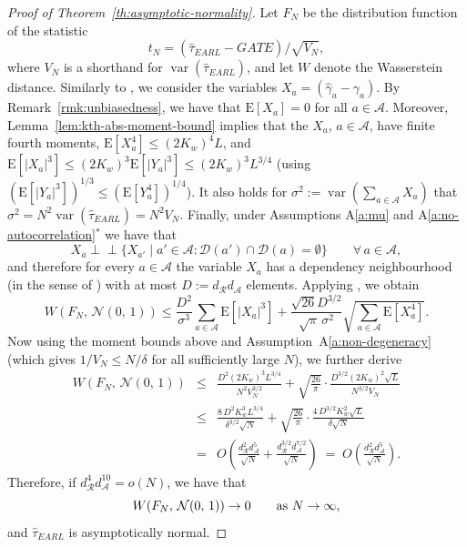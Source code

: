 \documentclass[sigconf,nonacm]{acmart}
\newcommand{\E}{\mathrm E}
\newcommand{\ind}{\perp\!\!\!\perp}
\DeclareMathOperator{\var}{var}
\begin{document}
\begin{proof}[Proof of Theorem~\ref{th:asymptotic-normality}]
    Let $F_N$ be the distribution function of the statistic
    $$
        t_N = {(\hat\tau^{\phantom{1}}_{EARL} - GATE)}/\sqrt{V_N},
    $$
    where $V_N$ is a shorthand for $\var(\hat\tau^{\phantom{1}}_{EARL})$,
    and let $W$ denote the Wasserstein distance.
    Similarly to \cite[Theorem~4.3]{harshaw2023erl}, we consider the variables $X_a = (\hat\gamma_a-\gamma_a)$. By Remark~\ref{rmk:unbiasedness}, we have that $\E[X_a] = 0$ for all $a\in\mathcal{A}$. Moreover, Lemma~\ref{lem:kth-abs-moment-bound} implies that the $X_a$, $a\in\mathcal{A}$, have finite fourth moments, $\E[X_a^4]\le (2K_w)^4L$, and $\E[|X_a|^3]\le (2K_w)^3\E[|Y_a|^3] \le (2K_w)^3L^{3/4}$ (using $(\E[|Y_a|^3])^{1/3}\le (\E[Y_a^4])^{1/4}$). It also holds for $\sigma^2 := \var(\sum_{a\in\mathcal{A}}X_a)$ that $\sigma^2 = N^2\var(\hat\tau^{\phantom{1}}_{EARL})=N^2V_N$. Finally,
    under Assumptions A\ref{a:mu} and A\ref{a:no-autocorrelation}$^*$ we have that
    \begin{equation*}
        X_a \ind \{X_{a'}\mid a'\in\mathcal A\colon \mathcal D(a')\cap \mathcal D(a)=\emptyset\}\qquad\forall\,a\in\mathcal A,
    \end{equation*}
    and therefore for every $a\in\mathcal A$ the variable $X_a$ has a dependency neighbourhood (in the sense of \cite[Definition~3.1]{Ro:11}) with at most $D:=d_{\mathcal R}d_{\mathcal A}$ elements. Applying \cite[Theorem~3.5]{Ro:11}, we obtain
    \begin{equation*}
        W(F_N,\,\mathcal{N}(0,\,1)) \le \frac{D^2}{\sigma^3}\sum_{a\in\mathcal A}\E[|X_a|^3] + \frac{\sqrt{26}D^{3/2}}{\sqrt{\pi}\,\sigma^2}\sqrt{\sum_{a\in\mathcal A}\E[
        X_a^4]}.
    \end{equation*}
    Now using the moment bounds above and Assumption~A\ref{a:non-degeneracy} (which gives $1/V_N \le N/\delta$ for all sufficiently large $N$), we further derive
    \begin{eqnarray*}
        W(F_N,\,\mathcal{N}(0,\,1)) &\le&
        \frac{D^2(2K_w)^3L^{3/4}}{N^2V_N^{3/2}}
        + \sqrt{\frac{26}{\pi}}\cdot\frac{D^{3/2}(2K_w)^2\sqrt{L}}{N^{3/2}V_N}\\
        &\le&\frac{8\,D^2K_w^3L^{3/4}}{\delta^{3/2}\sqrt N}
        + \sqrt{\frac{26}{\pi}}\cdot\frac{4\,D^{3/2}K_w^2\sqrt{L}}{\delta\sqrt N}
        \\
        &=& O\left(\frac{d^2_{\mathcal R}d^5_{\mathcal A}}{\sqrt{N}} + \frac{d_{\mathcal R}^{3/2}d_{\mathcal A}^{7/2}}{\sqrt{N}}\right)
        \;=\; O\left(\frac{d^2_{\mathcal R}d^5_{\mathcal A}}{\sqrt{N}}\right)\!.
    \end{eqnarray*}
    Therefore, if $d^{4}_{\mathcal{R}}d^{10}_{\mathcal{A}}=o(N)$, we have that
    \begin{equation*}
    W(F_N,\,\mathcal{N}(0,\,1)) \to 0\qquad \textup{as }N\to\infty,
    \end{equation*}
    and $\hat\tau^{\phantom{1}}_{EARL}$ is asymptotically normal.
\end{proof}
\end{document}
